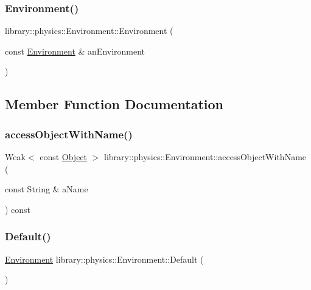 \subsubsection{\texorpdfstring{Environment()}{Environment()}\hspace{0.1cm}{\footnotesize\ttfamily [2/2]}}
{\footnotesize\ttfamily library\+::physics\+::\+Environment\+::\+Environment (\begin{DoxyParamCaption}\item[{const \hyperlink{classlibrary_1_1physics_1_1_environment}{Environment} \&}]{an\+Environment }\end{DoxyParamCaption})}



\subsection{Member Function Documentation}
\mbox{\label{classlibrary_1_1physics_1_1_environment_a86e1c1b5f7e7364610faf35491e2613a}} 
\subsubsection{\texorpdfstring{access\+Object\+With\+Name()}{accessObjectWithName()}}
{\footnotesize\ttfamily Weak$<$ const \hyperlink{classlibrary_1_1physics_1_1env_1_1_object}{Object} $>$ library\+::physics\+::\+Environment\+::access\+Object\+With\+Name (\begin{DoxyParamCaption}\item[{const String \&}]{a\+Name }\end{DoxyParamCaption}) const}

\mbox{\label{classlibrary_1_1physics_1_1_environment_a7fcc57999bfb9c0c7e70b7cc783e30c8}} 
\subsubsection{\texorpdfstring{Default()}{Default()}}
{\footnotesize\ttfamily \hyperlink{classlibrary_1_1physics_1_1_environment}{Environment} library\+::physics\+::\+Environment\+::\+Default (\begin{DoxyParamCaption}{ }\end{DoxyParamCaption})\hspace{0.3cm}{\ttfamily [static]}}

